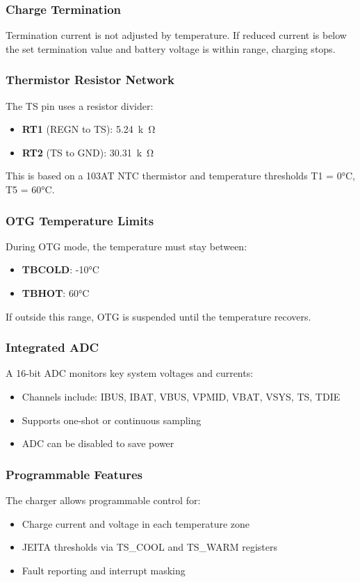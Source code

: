 \documentclass[12pt]{article}
\begin{document}
\subsubsection*{Charge Termination}
Termination current is not adjusted by temperature. If reduced current is below the set termination value and battery voltage is within range, charging stops.

\subsubsection*{Thermistor Resistor Network}
The TS pin uses a resistor divider:
\begin{itemize}
    \item \textbf{RT1} (REGN to TS): \SI{5.24}{k\ohm}
    \item \textbf{RT2} (TS to GND): \SI{30.31}{k\ohm}
\end{itemize}
This is based on a 103AT NTC thermistor and temperature thresholds T1 = 0°C, T5 = 60°C.

\subsubsection*{OTG Temperature Limits}
During OTG mode, the temperature must stay between:
\begin{itemize}
    \item \textbf{TBCOLD}: -10°C
    \item \textbf{TBHOT}: 60°C
\end{itemize}
If outside this range, OTG is suspended until the temperature recovers.

\subsubsection*{Integrated ADC}
A 16-bit ADC monitors key system voltages and currents:
\begin{itemize}
    \item Channels include: IBUS, IBAT, VBUS, VPMID, VBAT, VSYS, TS, TDIE
    \item Supports one-shot or continuous sampling
    \item ADC can be disabled to save power
\end{itemize}

\subsubsection*{Programmable Features}
The charger allows programmable control for:
\begin{itemize}
    \item Charge current and voltage in each temperature zone
    \item JEITA thresholds via TS\_COOL and TS\_WARM registers
    \item Fault reporting and interrupt masking
\end{itemize}
\end{document}
